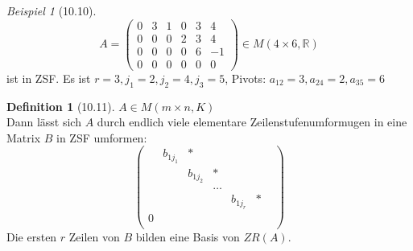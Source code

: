 \documentclass[a4paper]{scrartcl}
\theoremstyle{definition}
\newtheorem{defn}{Definition}
\theoremstyle{plain}
\theoremstyle{plain}
\theoremstyle{remark}
\theoremstyle{remark}
\theoremstyle{remark}
\theoremstyle{remark}
\theoremstyle{remark}
\newtheorem{ex}{Beispiel}
\begin{document}
\begin{ex}[10.10]
\begin{equation}
A =
\begin{pmatrix}
0 & 3 & 1 & 0 & 3 & 4 \\
0 & 0 & 0 & 2 & 3 & 4 \\
0 & 0 & 0 & 0 & 6 & -1 \\
0 & 0 & 0 & 0 & 0 & 0
\end{pmatrix}
\in M(4\times 6, \mathbb{R})
\end{equation}
ist in ZSF. Es ist $r = 3, j_1 = 2, j_2 = 4, j_3 = 5$, Pivots: $a_{12} = 3, a_{24} = 2, a_{35} = 6$
\end{ex}
\begin{defn}[10.11]
$A \in M(m\times n, K)$ \\
  Dann lässt sich $A$ durch endlich viele elementare Zeilenstufenumformugen in eine Matrix $B$ in ZSF umformen:
\begin{equation}
\begin{pmatrix}
& b_{1j_1} & \ast & & & & \\
& & b_{1j_2} & \ast & & & \\
& & & \ldots & & \\
& & & & b_{1j_r} & \ast & \\
0 & & & & & & \\
\end{pmatrix}
\end{equation}
Die ersten $r$ Zeilen von $B$ bilden eine Basis von $ZR(A)$.
\end{defn}
\end{document}
